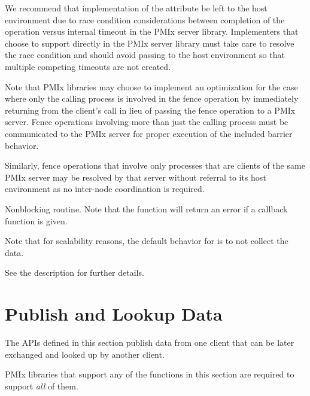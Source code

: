 
\optattrend

\adviceimplstart
We recommend that implementation of the  attribute be left to the host environment due to race condition considerations between completion of the operation versus internal timeout in the \ac{PMIx} server library. Implementers that choose to support  directly in the \ac{PMIx} server library must take care to resolve the race condition and should avoid passing  to the host environment so that multiple competing timeouts are not created.

Note that \ac{PMIx} libraries may choose to implement an optimization for the case where only the calling process is involved in the fence operation by immediately returning  from the client's call in lieu of passing the fence operation to a \ac{PMIx} server. Fence operations involving more than just the calling process must be communicated to the \ac{PMIx} server for proper execution of the included barrier behavior.

Similarly, fence operations that involve only processes that are clients of the same \ac{PMIx} server may be resolved by that server without referral to its host environment as no inter-node coordination is required.
\adviceimplend

\descr

Nonblocking  routine.
Note that the function will return an error if a  callback function is given.

Note that for scalability reasons, the default behavior for  is to not collect the data.

See the  description for further details.

\section{Publish and Lookup Data}
\label{chap:api_kv_mgmt:publish}

The APIs defined in this section publish data from one client that can be later exchanged and looked up by another client.

\adviceimplstart
\ac{PMIx} libraries that support any of the functions in this section are required to support \textit{all} of them.
\adviceimplend

